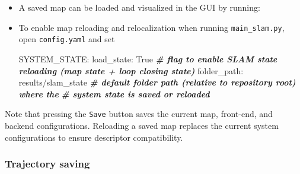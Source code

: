 \documentclass{article}
\newenvironment{Shaded}{\begin{snugshade}}{\end{snugshade}}
\newcommand{\BuiltInTok}[1]{\textcolor[rgb]{0.74,0.68,0.62}{#1}}
\newcommand{\CommentTok}[1]{\textcolor[rgb]{0.00,0.40,1.00}{\textbf{\textit{#1}}}}
\newcommand{\ExtensionTok}[1]{\textcolor[rgb]{0.74,0.68,0.62}{#1}}
\newcommand{\NormalTok}[1]{\textcolor[rgb]{0.74,0.68,0.62}{#1}}
\begin{document}
\begin{itemize}
\item
  A saved map can be loaded and visualized in the GUI by running: \\

\begin{scriptsize}
\begin{Shaded}
\end{Shaded}

\end{scriptsize}

\item
  To enable map reloading and relocalization when running
  \texttt{main\_slam.py}, open \texttt{config.yaml} and set \\

\begin{scriptsize}
\begin{Shaded}
\begin{Highlighting}[]
\ExtensionTok{SYSTEM_STATE}\NormalTok{:}
  \ExtensionTok{load_state}\NormalTok{: True                  }\CommentTok{# flag to enable SLAM state reloading (map state + loop closing state)}
  \ExtensionTok{folder_path}\NormalTok{: results/slam_state   }\CommentTok{# default folder path (relative to repository root) where the}
  \ExtensionTok{           }\NormalTok{                       }\CommentTok{# system state is saved or reloaded}  
\end{Highlighting}
\end{Shaded}
\end{scriptsize}

\end{itemize}

Note that pressing the \texttt{Save} button saves the current map,
front-end, and backend configurations. Reloading a saved map replaces
the current system configurations to ensure descriptor compatibility.

\hypertarget{trajectory-saving}{%
\subsubsection{Trajectory saving}\label{trajectory-saving}}
\end{document}
